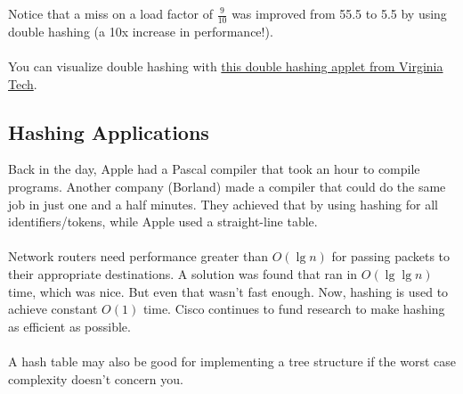 \documentclass[]{article}
\theoremstyle{definition}
\begin{document}
				Notice that a miss on a load factor of $\frac{9}{10}$ was improved from 55.5 to 5.5 by using double hashing (a 10x increase in performance!).
				\\ \\
				You can visualize double hashing with \href{http://research.cs.vt.edu/AVresearch/hashing/double.php}{this double hashing applet from Virginia Tech}.

		\subsection{Hashing Applications}
        Back in the day, Apple had a Pascal compiler that took an hour to compile programs. Another company (Borland) made a compiler that could do the same job in just one and a half minutes. They achieved that by using hashing for all identifiers/tokens, while Apple used a straight-line table.
			\\ \\
			Network routers need performance greater than $O(\lg n)$ for passing packets to their appropriate destinations. A solution was found that ran in $O(\lg \lg n)$ time, which was nice. But even that wasn't fast enough. Now, hashing is used to achieve constant $O(1)$ time. Cisco continues to fund research to make hashing as efficient as possible.
			\\ \\
			A hash table may also be good for implementing a tree structure if the worst case complexity doesn't concern you.
		
\end{document}
